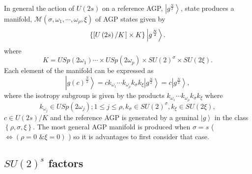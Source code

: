\documentclass[aps,preprint]{revtex4}%
\begin{document}
In general the action of $U\left(  2s\right)  $ on a reference AGP,
$\left\vert g^{\frac{N}{2}}\right\rangle $, state produces a manifold,
$\mathcal{M}\left(  \sigma,\omega_{1},\cdots,\omega_{\rho},\xi\right)  $ of
AGP states given by
\begin{equation}
\left\{  \left[  U\left(  2s\right)  \left/  K\overset{}{}\right.  \right]
\times K\right\}  \left\vert g^{\frac{N}{2}}\right\rangle . \label{su2act}%
\end{equation}
where
\begin{equation}
K=USp\left(  2\omega_{1}\right)  \cdots\times USp\left(  2\omega_{p}\right)
\times SU\left(  2\right)  ^{\sigma}\times SU\left(  2\xi\right)  .
\end{equation}
Each element of the manifold can be expressed as
\begin{equation}
\left\vert g\left(  c\right)  ^{\frac{N}{2}}\right\rangle =ck_{\omega_{1}%
}\cdots k_{\omega_{\rho}}k_{\sigma}k_{\xi}\left\vert g^{\frac{N}{2}%
}\right\rangle =c\left\vert g^{\frac{N}{2}}\right\rangle ,
\end{equation}
where the isotropy subgroup is given by the products $k_{\omega_{1}}\cdots
k_{\omega_{\rho}}k_{\sigma}k_{\xi}$ where%
\begin{equation}
k_{\omega_{j}}\in USp\left(  2\omega_{j}\right)  ;1\leq j\leq\rho,k_{\sigma
}\in SU\left(  2\right)  ^{\sigma},k_{\xi}\in SU\left(  2\xi\right)  ,
\end{equation}
$c\in U\left(  2s\right)  /K$ and the reference AGP is generated by a geminal
$\left\vert g\right\rangle $ in the class $\left\{  \rho,\sigma,\xi\right\}
.$ The most general AGP manifold is produced when $\sigma=s$ ($\Leftrightarrow
\left(  \rho=0\text{ \& }\xi=0\right)  $ ) so it is advantages to first
consider that case.

\subsection{$SU\left(  2\right)  ^{s}$ factors}
\end{document}
